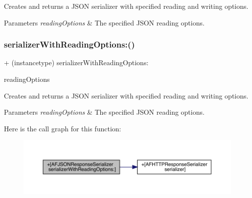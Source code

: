 Creates and returns a J\+S\+ON serializer with specified reading and writing options.


\begin{DoxyParams}{Parameters}
{\em reading\+Options} & The specified J\+S\+ON reading options. \\
\hline
\end{DoxyParams}
\mbox{\label{interface_a_f_j_s_o_n_response_serializer_a84c05ae2bc646684aa9cb39041687979}} 
\subsubsection{\texorpdfstring{serializer\+With\+Reading\+Options\+:()}{serializerWithReadingOptions:()}\hspace{0.1cm}{\footnotesize\ttfamily [2/3]}}
{\footnotesize\ttfamily + (instancetype) serializer\+With\+Reading\+Options\+: \begin{DoxyParamCaption}\item[{(N\+S\+J\+S\+O\+N\+Reading\+Options)}]{reading\+Options }\end{DoxyParamCaption}}

Creates and returns a J\+S\+ON serializer with specified reading and writing options.


\begin{DoxyParams}{Parameters}
{\em reading\+Options} & The specified J\+S\+ON reading options. \\
\hline
\end{DoxyParams}
Here is the call graph for this function\+:\nopagebreak
\begin{figure}[H]
\begin{center}
\leavevmode
\includegraphics[width=350pt]{interface_a_f_j_s_o_n_response_serializer_a84c05ae2bc646684aa9cb39041687979_cgraph}
\end{center}
\end{figure}
\mbox{\label{interface_a_f_j_s_o_n_response_serializer_a84c05ae2bc646684aa9cb39041687979}} 
